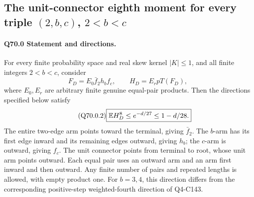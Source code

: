 \subsection{The unit-connector eighth moment for every triple \((2,\allowbreak b,\allowbreak c)\), \(2<\allowbreak b<\allowbreak c\)}\label{proof:Q5-C070}

\paragraph{Q70.0 Statement and directions.}
For every finite probability space and real skew kernel \(|K|\le\allowbreak 1\),
and all finite integers \(2<\allowbreak b<\allowbreak c\), consider
\begin{equation}\tag{Q70.0.1}\label{eq:Q70:0.1}
F_D=E_0\bar f_2h_bf_c,\qquad H_D=E_rpT(F_D),
\end{equation}
where \(E_0,\allowbreak E_r\) are arbitrary finite genuine equal-pair products.
Then the directions specified below satisfy
\begin{equation}\tag{Q70.0.2}\label{eq:Q70:0.2}
\boxed{\mathbb E H_D^8\le e^{-d/27}\le1-d/28.}
\end{equation}
The entire two-edge arm points toward the terminal, giving
\(\bar f_2\). The \(b\)-arm has its first edge inward and its
remaining edges outward, giving \(h_b\); the \(c\)-arm is outward,
giving \(f_c\). The unit connector points from terminal to root,
whose unit arm points outward. Each equal pair uses an outward arm
and an arm first inward and then outward. Any finite number of pairs
and repeated lengths is allowed, with empty product one.
For \(b=\allowbreak 3,\allowbreak 4\), this direction differs from the corresponding
positive-step weighted-fourth direction of Q4-C143.

